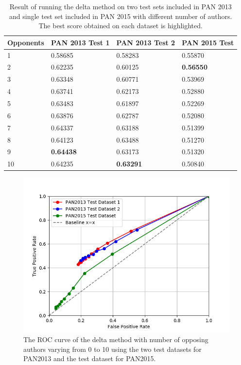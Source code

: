 \begin{table}
    \centering
    \begin{tabular}{l|lll}
        \textbf{Opponents} & \textbf{PAN 2013 Test 1} & \textbf{PAN 2013 Test 2}
        & \textbf{PAN 2015 Test} \\ \hline
        1  & 0.58685 & 0.58283 & 0.55870 \\
        2  & 0.62235 & 0.60125 & \textbf{0.56550} \\
        3  & 0.63348 & 0.60771 & 0.53969 \\
        4  & 0.63741 & 0.62173 & 0.52880 \\
        5  & 0.63483 & 0.61897 & 0.52269 \\
        6  & 0.63876 & 0.62787 & 0.52080 \\
        7  & 0.64337 & 0.63188 & 0.51399 \\
        8  & 0.64123 & 0.63488 & 0.51270 \\
        9  & \textbf{0.64438} & 0.63173 & 0.51320 \\
        10 & 0.64235 & \textbf{0.63291} & 0.50840
    \end{tabular}
    \caption{Result of running the delta method on two test sets included in PAN
    2013 and single test set included in PAN 2015 with different number of
    authors. The best score obtained on each dataset is highlighted.}
    \label{tab:delta_method_final_results}
\end{table}

\begin{figure}
    \centering
    \includegraphics[width=.7\textwidth]{./pictures/delta_method_roc.png}
    \caption{The ROC curve of the delta method with number of opposing authors
    varying from 0 to 10 using the two test datasets for PAN2013 and the test
    dataset for PAN2015.}
    \label{fig:delta_method_roc}
\end{figure}

